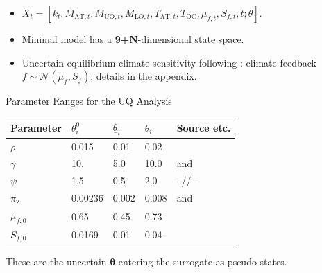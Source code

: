 \documentclass[10pt,aspectratio=169]{beamer}
\newcommand{\keyc}[1]{\textcolor{uzhblue}{#1}}
\begin{document}
\begin{frame}
\begin{footnotesize}
\begin{itemize}
    \item $X_{t} = \left[ k_{t}, M_{\mathrm{AT}, t}, M_{\mathrm{UO}, t}, M_{\mathrm{LO}, t}, T_{\mathrm{AT}, t}, T_{\mathrm{OC}}, \mu_{f,t}, S_{f,t}, t; \theta\right]$.
    \item \keyc{Minimal model has a \textbf{9+N}-dimensional state space}.
    \item Uncertain equilibrium climate sensitivity following \cite{roe2007climate}: climate feedback $f \sim \mathcal{N}(\mu_f, S_f)$; details in the appendix.
\end{itemize}
\end{footnotesize}
\end{frame}

\begin{frame}[fragile]{Parameter Ranges for the UQ Analysis}
\begin{table}
\label{table:param_UQ}
\centering
\begin{tabularx}{\linewidth}{lllll}
\toprule
Parameter &  $\theta^{0}_{i}$ &
$\underline{\theta}_{i}$&  $\overline{\theta}_{i}$ & Source
  etc.\\
\midrule
$\rho$ & 0.015 & 0.01 & 0.02 & {\citet{stern2007economics}}\\
$\gamma$ & 10. & 5.0 & 10.0 & \makecell[l]{\citet{jensen_traeger_2014} and \\ \citet{Cai_Lontzek_2019}}\\
$\psi$ & 1.5 & 0.5 & 2.0 & --//-- \\
$\pi_{2}$ & 0.00236 & 0.002  & 0.008 & \makecell[l]{\citet{nordhaus2017revisiting} and \\ \citet{weitzman2012ghg}}\\
$\mu_{f,0}$  & 0.65 &  0.45 & 0.73 & \citet{roe2007climate}\\
$S_{f,0}$  & 0.0169 & 0.01 & 0.04 & \citet{roe2007climate}\\
\bottomrule
\end{tabularx}
\end{table}
\vspace{0.3em}
{\footnotesize These are the uncertain $\bm{\theta}$ entering the surrogate as pseudo-states.}
\end{frame}
\end{document}
